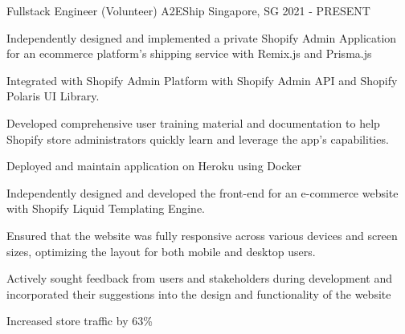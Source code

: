 \begin{cventries}
  \cventry
  {Fullstack Engineer (Volunteer)} %
  {A2EShip} %
  {Singapore, SG}
  {2021 - PRESENT}
  {
    \begin{cvitems} %
      \item Independently designed and implemented a private Shopify Admin Application for
      an ecommerce platform's shipping service with Remix.js and Prisma.js
      \item Integrated with Shopify Admin Platform with Shopify Admin API and Shopify
      Polaris UI Library.
      \item Developed comprehensive user training material and documentation to help
      Shopify store administrators quickly learn and leverage the app's capabilities.
      \item Deployed and maintain application on Heroku using Docker
      \item Independently designed and developed the front-end for an e-commerce website
      with Shopify Liquid Templating Engine.
      \item Ensured that the website was fully responsive across various devices and screen
      sizes, optimizing the layout for both mobile and desktop users.
      \item Actively sought feedback from users and stakeholders during development and
      incorporated their suggestions into the design and functionality of the website
      \item Increased store traffic by 63\%
    \end{cvitems}
  }
\end{cventries}
